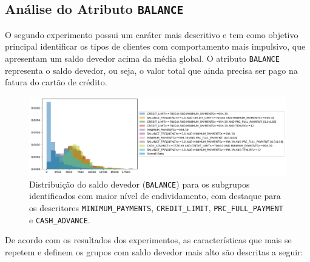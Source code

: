 \documentclass[12pt]{article}
\begin{document}
\subsection{Análise do Atributo \texttt{BALANCE}}

O segundo experimento possui um caráter mais descritivo e tem como objetivo principal identificar os tipos de clientes com comportamento mais impulsivo, que apresentam um saldo devedor acima da média global. O atributo \texttt{BALANCE} representa o saldo devedor, ou seja, o valor total que ainda precisa ser pago na fatura do cartão de crédito.

\begin{figure}[h]
    \centering
    \includegraphics[width=1\textwidth]{imagens/experimento3.png}
    \caption{Distribuição do saldo devedor (\texttt{BALANCE}) para os subgrupos identificados com maior nível de endividamento, com destaque para os descritores \texttt{MINIMUM\_PAYMENTS}, \texttt{CREDIT\_LIMIT}, \texttt{PRC\_FULL\_PAYMENT} e \texttt{CASH\_ADVANCE}.}

    \label{fig:experimento2_1}
\end{figure}

De acordo com os resultados dos experimentos, as características que mais se repetem e definem os grupos com saldo devedor mais alto são descritas a seguir:
\end{document}
